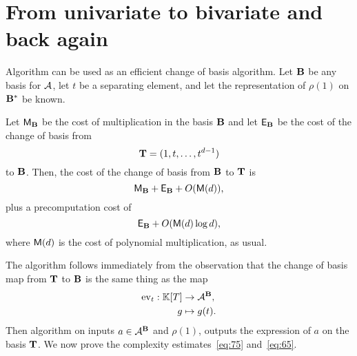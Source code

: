 \section{From univariate to bivariate and back again}
\label{sec:from-univ-bivar}

Algorithm  can be used as an efficient change of basis
algorithm. Let $\mathbf{B}$ be any basis for $\mathcal{A}$, let $t$ be a
separating element, and let the representation of $\rho(1)$ on
$\mathbf{B}^\ast$ be known.

\begin{proposition}
  \label{th:uni-multi-uni}
  Let $\mathsf{M}_{\mathbf{B}}$ be the cost of multiplication in the basis
  $\mathbf{B}$ and let $\mathsf{E}_\mathbf{B}$ be the cost of the change of basis from
    \begin{equation}
    \label{eq:74}
    \mathbf{T} = (1,t,\ldots,t^{d-1})
  \end{equation}
  to $\mathbf{B}$. Then, the cost of the change of basis from
  $\mathbf{B}$ to $\mathbf{T}$ is
  \begin{equation}
    \label{eq:75}
    \mathsf{M}_{\mathbf{B}} + \mathsf{E}_{\mathbf{B}} + O(\mathsf{M}(d))
    \text{,}
  \end{equation}
  plus a precomputation cost of
  \begin{equation}
    \label{eq:65}
    \mathsf{E}_{\mathbf{B}} + O(\mathsf{M}(d)\log d)
    \text{,}
  \end{equation}
  where $\mathsf{M}(d)$ is the cost of polynomial multiplication, as usual.
\end{proposition}

The algorithm follows immediately from the observation that the change
of basis map from $\mathbf{T}$ to $\mathbf{B}$ is the same thing as the
map
\begin{equation}
  \label{eq:76}
  \begin{aligned}
    \operatorname{ev}_t : \mathbb{K}[T] &\rightarrow \mathcal{A}^{\mathbf{B}}\text{,}\\
    g &\mapsto g(t)\text{.}
  \end{aligned}
\end{equation}
Then algorithm  on inputs $a\in\mathcal{A}^{\mathbf{B}}$ and
$\rho(1)$, outputs the expression of $a$ on the basis $\mathbf{T}$. We
now prove the complexity estimates~\eqref{eq:75} and~\eqref{eq:65}.

